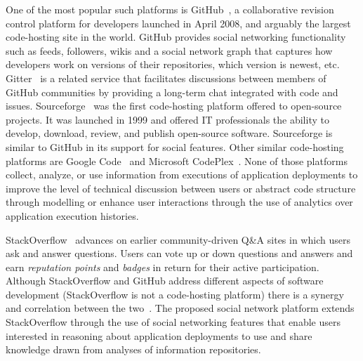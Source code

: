 One of the most popular such platforms is GitHub~\cite{github_url}, a collaborative revision control platform for developers launched in April 2008, and arguably the largest code-hosting site in the world. 
GitHub provides social networking functionality such as feeds, followers, wikis and a social network graph that captures how developers work on versions of their repositories, which version is newest, etc.
Gitter~\cite{gitter} is a related service that facilitates discussions between members of GitHub communities by providing a long-term chat integrated with code and issues.
Sourceforge~\cite{sourceforge} was the first code-hosting platform offered to open-source projects. It was launched in 1999 and offered IT professionals the ability to develop, download, review, and publish open-source software. Sourceforge is similar to GitHub in its support for social features.
Other similar code-hosting platforms are Google Code~\cite{googlecode} and Microsoft CodePlex~\cite{codeplex}.
None of those platforms collect, analyze, or use information from executions of application deployments to improve the level of technical discussion between users or abstract code structure through modelling or enhance user interactions through the use of analytics over application execution histories.

StackOverflow~\cite{stackoverflow} advances on earlier community-driven Q\&A sites in which users ask and answer questions. Users can vote up or down questions and answers and earn \emph{reputation points} and \emph{badges} in return for their active participation. 
Although StackOverflow and GitHub address different aspects of software development (StackOverflow is not a code-hosting platform) there is a synergy and correlation between the two~\cite{stackgit}. The proposed social network platform extends StackOverflow through the use of social networking features that enable users interested in reasoning about application deployments to use and share knowledge drawn from analyses of information repositories.


